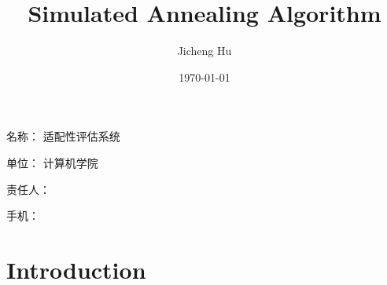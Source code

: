 \documentclass[a4paper,12pt]{ctexbook}	%
\title{Simulated Annealing Algorithm}
\author{Jicheng Hu}
\date{\today}
\begin{document}
\begin{titlepage}
\pagenumbering{}	%
\songti{}	%


名\quad 称：	适配性评估系统

单\quad 位：	计算机学院

责任人：	

手\quad 机：	

\end{titlepage}


\maketitle

\frontmatter	%








\mainmatter		%

\chapter{Introduction}
\end{document}
